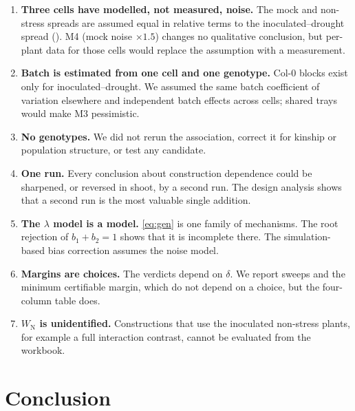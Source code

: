 \documentclass[10pt,twocolumn,a4paper]{article}
\theoremstyle{definition}
\theoremstyle{remark}
\newcommand{\WN}{{W_{\mathrm N}}}
\begin{document}
\begin{enumerate}[label=\textbf{L\arabic*.},leftmargin=2.1em,itemsep=2pt]
  \item \textbf{Three cells have modelled, not measured, noise.} The
  mock and non-stress spreads are assumed equal in relative terms to the
  inoculated--drought spread (). M4 (mock noise
  $\times1.5$) changes no qualitative conclusion, but per-plant data for
  those cells would replace the assumption with a measurement.
  \item \textbf{Batch is estimated from one cell and one genotype.} Col-0
  blocks exist only for inoculated--drought. We assumed the same batch
  coefficient of variation elsewhere and independent batch effects
  across cells; shared trays would make M3 pessimistic.
  \item \textbf{No genotypes.} We did not rerun the association, correct
  it for kinship or population structure, or test any candidate.
  \item \textbf{One run.} Every conclusion about construction
  dependence could be sharpened, or reversed in shoot, by a second run.
  The design analysis shows that a second run is the most valuable single
  addition.
  \item \textbf{The $\lambda$ model is a model.} \eqref{eq:gen} is one
  family of mechanisms. The root rejection of $b_1+b_2=1$ shows that it
  is incomplete there. The simulation-based bias correction assumes the
  noise model.
  \item \textbf{Margins are choices.} The verdicts depend on $\delta$. We
  report sweeps and the minimum certifiable margin, which do not depend
  on a choice, but the four-column table does.
  \item \textbf{$\WN$ is unidentified.} Constructions that use the
  inoculated non-stress plants, for example a full interaction contrast,
  cannot be evaluated from the workbook.
\end{enumerate}

\section{Conclusion}
\label{sec:conclusion}
\end{document}
